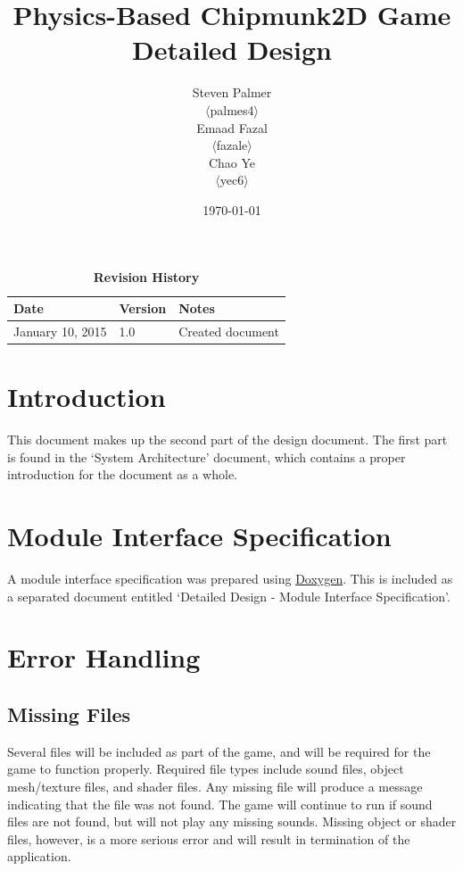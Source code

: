 \documentclass[12pt, titlepage]{article}
\begin{document}
\title{\bf Physics-Based Chipmunk2D Game\\[\baselineskip]\Large Detailed Design}
\author{Steven Palmer\\$\langle$palmes4$\rangle$\\Emaad Fazal\\$\langle$fazale$\rangle$\\Chao Ye\\$\langle$yec6$\rangle$}
\date{\today}
	
\maketitle

\tableofcontents
\listoftables
\listoffigures


\begin{table}[bp]
\caption*{\bf Revision History}
\begin{tabularx}{\textwidth}{p{3.5cm}p{2cm}X}
\toprule {\bf Date} & {\bf Version} & {\bf Notes}\\
\midrule
January 10, 2015 & 1.0 & Created document\\
\bottomrule
\end{tabularx}
\end{table}

\newpage


\section{Introduction}
This document makes up the second part of the design document.  The first part is found in the `System Architecture' document, which contains a proper introduction for the document as a whole.

\section{Module Interface Specification}
A module interface specification was prepared using \href{www.doxygen.org/}{Doxygen}.  This is included as a separated document entitled `Detailed Design - Module Interface Specification'.



\section{Error Handling}
\subsection{Missing Files}
Several files will be included as part of the game, and will be required for the game to function properly.  Required file types include sound files, object mesh/texture files, and shader files.  Any missing file will produce a message indicating that the file was not found.  The game will continue to run if sound files are not found, but will not play any missing sounds.  Missing object or shader files, however, is a more serious error and will result in termination of the application.
\end{document}
